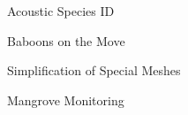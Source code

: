 \item Acoustic Species ID
\item Baboons on the Move
\item Simplification of Special Meshes
\item Mangrove Monitoring
